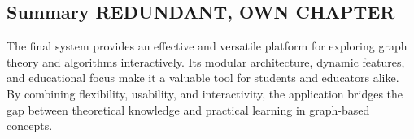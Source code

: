 \subsection{Summary REDUNDANT, OWN CHAPTER}
The final system provides an effective and versatile platform for exploring graph theory and algorithms interactively. Its modular architecture, dynamic features, and educational focus make it a valuable tool for students and educators alike. By combining flexibility, usability, and interactivity, the application bridges the gap between theoretical knowledge and practical learning in graph-based concepts.
